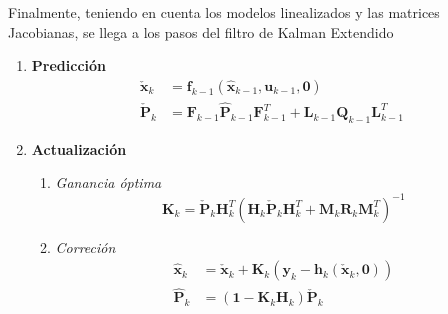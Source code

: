 Finalmente, teniendo en cuenta los modelos linealizados y las matrices Jacobianas, se llega a los pasos del filtro de Kalman Extendido
\begin{enumerate}
    \item \textbf{Predicción}
        \begin{align}
            \check{\bm{x}}_k &= \bm{f}_{k-1}(\hat{\bm{x}}_{k-1},\bm{u}_{k-1},\bm{0})\\
            \check{\bm{P}}_k &= \bm{F}_{k-1}\hat{\bm{P}}_{k-1}\bm{F}_{k-1}^T + \bm{L}_{k-1}\bm{Q}_{k-1}\bm{L}_{k-1}^T
        \end{align}
    \item \textbf{Actualización}
    \begin{enumerate}
        \item \textit{Ganancia óptima}
            \begin{equation}
                \bm{K}_k = \check{\bm{P}}_k\bm{H}_k^T(\bm{H}_k\check{\bm{P}}_k\bm{H}_k^T + \bm{M}_k\bm{R}_k\bm{M}_k^T)^{-1}
            \end{equation}
        \item \textit{Correción}
            \begin{align}
                \hat{\bm{x}}_k &= \check{\bm{x}}_k + \bm{K}_k(\bm{y}_k - \bm{h}_k(\check{\bm{x}}_k,\bm{0}))\\
                \hat{\bm{P}}_k &= (\bm{1} - \bm{K}_k\bm{H}_k)\check{\bm{P}}_k
            \end{align}
    \end{enumerate}
\end{enumerate}